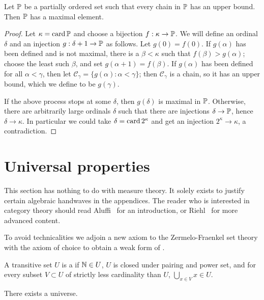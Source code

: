 \begin{theorem}
Let $\mathbb{P}$ be a partially ordered set such that every chain in $\mathbb{P}$ has an upper bound.
Then $\mathbb{P}$ has a maximal element.
\end{theorem}
\begin{proof}
Let $\kappa = \operatorname{card} \mathbb{P}$ and choose a bijection $f: \kappa \to \mathbb{P}$.
We will define an ordinal $\delta$ and an injection $g: \delta + 1 \to \mathbb{P}$ as follows.
Let $g(0) = f(0)$. If $g(\alpha)$ has been defined and is not maximal, there is a $\beta < \kappa$ such that $f(\beta) > g(\alpha)$; choose the least such $\beta$, and set $g(\alpha + 1) = f(\beta)$.
If $g(\alpha)$ has been defined for all $\alpha < \gamma$, then let $\mathcal C_{\gamma} = \{g(\alpha): \alpha < \gamma\}$; then $\mathcal C_{\gamma}$ is a chain, so it has an upper bound, which we define to be $g(\gamma)$.

If the above process stops at some $\delta$, then $g(\delta)$ is maximal in $\mathbb{P}$.
Otherwise, there are arbitrarily large ordinals $\delta$ such that there are injections $\delta \to \mathbb{P}$, hence $\delta \to \kappa$.
In particular we could take $\delta = \operatorname{card} 2^{\kappa}$ and get an injection $2^{\kappa} \to \kappa$, a contradiction.
\end{proof}

\section{Universal properties}
This section has nothing to do with measure theory.
It solely exists to justify certain algebraic handwaves in the appendices.
The reader who is interested in category theory should read Aluffi~\cite{aluffi2009algebra} for an introduction, or Riehl~\cite{riehl2017category} for more advanced content.

\begin{subsec}
To avoid technicalities we adjoin a new axiom to the Zermelo-Fraenkel set theory with the axiom of choice to obtain a weak form of .
\end{subsec}

\begin{definition}
A transitive set $U$ is a  if $\mathbb{N} \in U$, $U$ is closed under pairing and power set, and for every subset $V \subset U$ of strictly less cardinality than $U$, $\bigcup_{x \in V} x \in U$.
\end{definition}

\begin{axiom}[universe]
There exists a universe.
\end{axiom}

